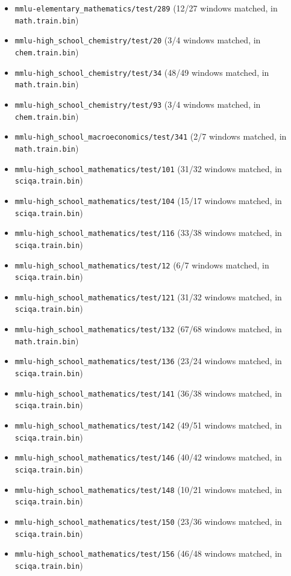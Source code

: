 \begin{itemize}
\item \texttt{mmlu-elementary\_mathematics/test/289} (12/27 windows matched, in \texttt{math.train.bin})
\item \texttt{mmlu-high\_school\_chemistry/test/20} (3/4 windows matched, in \texttt{chem.train.bin})
\item \texttt{mmlu-high\_school\_chemistry/test/34} (48/49 windows matched, in \texttt{math.train.bin})
\item \texttt{mmlu-high\_school\_chemistry/test/93} (3/4 windows matched, in \texttt{chem.train.bin})
\item \texttt{mmlu-high\_school\_macroeconomics/test/341} (2/7 windows matched, in \texttt{math.train.bin})
\item \texttt{mmlu-high\_school\_mathematics/test/101} (31/32 windows matched, in \texttt{sciqa.train.bin})
\item \texttt{mmlu-high\_school\_mathematics/test/104} (15/17 windows matched, in \texttt{sciqa.train.bin})
\item \texttt{mmlu-high\_school\_mathematics/test/116} (33/38 windows matched, in \texttt{sciqa.train.bin})
\item \texttt{mmlu-high\_school\_mathematics/test/12} (6/7 windows matched, in \texttt{sciqa.train.bin})
\item \texttt{mmlu-high\_school\_mathematics/test/121} (31/32 windows matched, in \texttt{sciqa.train.bin})
\item \texttt{mmlu-high\_school\_mathematics/test/132} (67/68 windows matched, in \texttt{math.train.bin})
\item \texttt{mmlu-high\_school\_mathematics/test/136} (23/24 windows matched, in \texttt{sciqa.train.bin})
\item \texttt{mmlu-high\_school\_mathematics/test/141} (36/38 windows matched, in \texttt{sciqa.train.bin})
\item \texttt{mmlu-high\_school\_mathematics/test/142} (49/51 windows matched, in \texttt{sciqa.train.bin})
\item \texttt{mmlu-high\_school\_mathematics/test/146} (40/42 windows matched, in \texttt{sciqa.train.bin})
\item \texttt{mmlu-high\_school\_mathematics/test/148} (10/21 windows matched, in \texttt{sciqa.train.bin})
\item \texttt{mmlu-high\_school\_mathematics/test/150} (23/36 windows matched, in \texttt{sciqa.train.bin})
\item \texttt{mmlu-high\_school\_mathematics/test/156} (46/48 windows matched, in \texttt{sciqa.train.bin})

\end{itemize}
